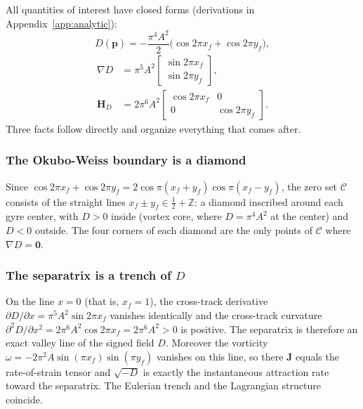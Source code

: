 \documentclass[lettersize,journal]{IEEEtran}
\begin{document}
All quantities of interest have closed forms (derivations in
Appendix~\ref{app:analytic}):
\begin{equation}
    D(\mathbf{p}) = -\frac{\pi^4 A^2}{2}
    \bigl(\cos 2\pi x_f + \cos 2\pi y_f\bigr),
    \label{eq:det_analytic_main}
\end{equation}
\begin{equation}
    \begin{aligned}
    \nabla D &= \pi^5 A^2
    \begin{bmatrix} \sin 2\pi x_f \\ \sin 2\pi y_f \end{bmatrix},
    \\
    \mathbf{H}_D &= 2\pi^6 A^2
    \begin{bmatrix} \cos 2\pi x_f & 0 \\ 0 & \cos 2\pi y_f \end{bmatrix}.
    \end{aligned}
    \label{eq:gradhess_analytic_main}
\end{equation}
Three facts follow directly and organize everything that comes after.

\subsubsection{The Okubo-Weiss boundary is a diamond}
Since $\cos 2\pi x_f + \cos 2\pi y_f = 2\cos\pi(x_f + y_f)\cos\pi(x_f -
y_f)$, the zero set $\mathcal{C}$ consists of the straight lines
$x_f \pm y_f \in \tfrac{1}{2} + \mathbb{Z}$: a diamond inscribed around
each gyre center, with $D > 0$ inside (vortex core, where $D = \pi^4 A^2$
at the center) and $D < 0$ outside. The four corners of each diamond are
the only points of $\mathcal{C}$ where $\nabla D = \mathbf{0}$.

\subsubsection{The separatrix is a trench of $D$}
On the line $x = 0$ (that is, $x_f = 1$), the cross-track derivative
$\partial D/\partial x = \pi^5 A^2 \sin 2\pi x_f$ vanishes identically
and the cross-track curvature $\partial^2 D/\partial x^2 = 2\pi^6 A^2
\cos 2\pi x_f = 2\pi^6 A^2 > 0$ is positive. The separatrix is therefore
an exact valley line of the signed field $D$. Moreover the vorticity
$\omega = -2\pi^2 A \sin(\pi x_f)\sin(\pi y_f)$ vanishes on this line, so
there $\mathbf{J}$ equals the rate-of-strain tensor and $\sqrt{-D}$ is
exactly the instantaneous attraction rate toward the separatrix. The
Eulerian trench and the Lagrangian structure coincide.
\end{document}
